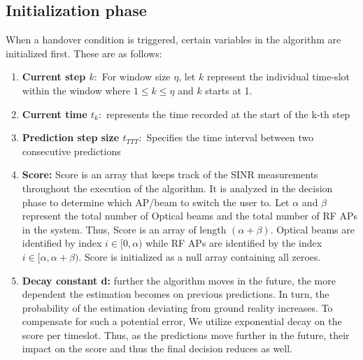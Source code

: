\subsection{Initialization phase}
When a handover condition is triggered, certain variables in the algorithm are initialized first. These are as follows:
\begin{enumerate}
    \item \textbf{Current step $k:$} For window size $\eta$, let $k$ represent the individual time-slot within the window where $1 \leq k \leq \eta$ and $k$ starts at 1. 
    \item \textbf{Current time $t_k:$} represents the time recorded at the start of the k-th step 
    \item \textbf{Prediction step size $t_{TTT}:$} Specifies the time interval between two consecutive predictions
    \item \textbf{Score:} Score is an array that keeps track of the SINR measurements throughout the execution of the algorithm. It is analyzed in the decision phase to determine which AP/beam to switch the user to. Let $\alpha$ and $\beta$ represent the total number of Optical beams and the total number of RF APs in the system. Thus, Score is an array of length $(\alpha + \beta)$. Optical beams are identified by index $i \in [0, \alpha)$ while RF APs are identified by the index $i \in [\alpha, \alpha + \beta)$. Score is initialized as a null array containing all zeroes.
    \item \textbf{Decay constant d:} further the algorithm moves in the future, the more dependent the estimation becomes on previous predictions. In turn, the probability of the estimation deviating from ground reality increases. To compensate for such a potential error, We utilize exponential decay on the score per timeslot. Thus, as the predictions move further in the future, their impact on the score and thus the final decision reduces as well.
\end{enumerate}
